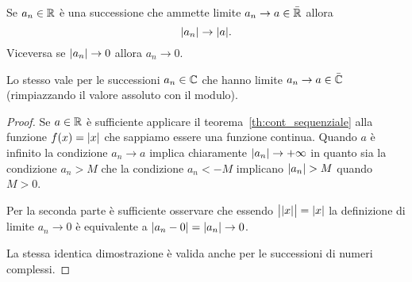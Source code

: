 \begin{theorem}
\mymark{**}
\label{th:limite_abs}
Se $a_n\in \mathbb R$ è una successione che ammette limite $a_n \to a \in \bar {\mathbb R}$
allora
\[
  {\left|a_n\right|} \to {\left|a\right|}.
\]
Viceversa se ${\left|a_n\right|} \to 0$ allora $a_n \to 0$.

Lo stesso vale per le successioni $a_n\in \mathbb C$ che hanno limite
$a_n\to a\in \bar {\mathbb C}$ (rimpiazzando il valore assoluto
con il modulo).
\end{theorem}
%
\begin{proof}
Se $a\in \mathbb R$ è sufficiente applicare il teorema~\ref{th:cont_sequenziale}
alla funzione $f(x)={\left|x\right|}$ che sappiamo essere una funzione continua.
Quando $a$ è infinito la condizione $a_n\to a$ implica chiaramente
${\left|a_n\right|}\to +\infty$ in quanto sia la condizione $a_n>M$
che la condizione
$a_n < -M$ implicano ${\left|a_n\right|}>M$ quando $M>0$.

Per la seconda parte è sufficiente osservare che essendo
$\big\lvert{\left|x\right|}\big\rvert
 = {\left|x\right|}$ la definizione di limite $a_n\to 0$ è equivalente a
 ${\left|a_n-0\right|}={\left|a_n\right|}\to 0$.

 La stessa identica dimostrazione è valida anche per le successioni di numeri complessi.
\end{proof}

